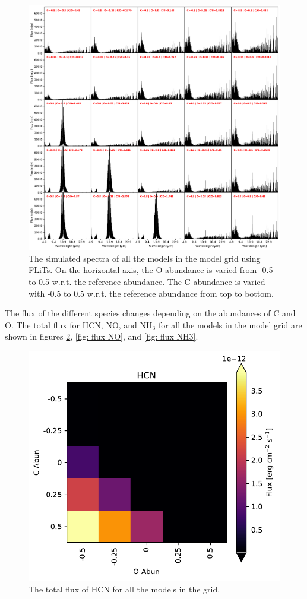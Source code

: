 \documentclass[oneside, single, authoryear, semicolon]{lion-msc}
\newcommand{\4}{$_4$}
\newcommand{\3}{$_3$}
\newcommand{\2}{$_2$}
\begin{document}
\begin{figure}[!ht]
    \centering
    \includegraphics[width=\linewidth]{Figures/All_spectra.pdf}
    \caption{The simulated spectra of all the models in the model grid using FLiTs. On the horizontal axis, the O abundance is varied from -0.5 to 0.5 w.r.t. the reference abundance. The C abundance is varied with -0.5 to 0.5 w.r.t. the reference abundance from top to bottom.}
    \label{fig: all spectra}
\end{figure}

The flux of the different species changes depending on the abundances of C and O. The total flux for HCN, NO, and NH\3 for all the models in the model grid are shown in figures \ref{fig: flux HCN}, \ref{fig: flux NO}, and \ref{fig: flux NH3}. 

\begin{figure}[!ht]
    \centering
    \includegraphics[width=0.5\linewidth]{Figures/HCN_heatmap.pdf}
    \caption{The total flux of HCN for all the models in the grid.}
    \label{fig: flux HCN}
\end{figure}
\end{document}
